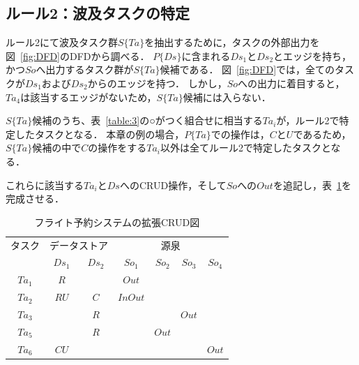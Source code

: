 \documentclass[a4paper,11pt]{jreport}
\begin{document}
\subsection{ルール2：波及タスクの特定}
ルール2にて波及タスク群$S\{Ta\}$を抽出するために，タスクの外部出力を図~\ref{fig:DFD}のDFDから調べる．
$P\{Ds\}$に含まれる$Ds_1$と$Ds_2$とエッジを持ち，かつ$So$へ出力するタスク群が$S\{Ta\}$候補である．
図~\ref{fig:DFD}では，全てのタスクが$Ds_1$および$Ds_2$からのエッジを持つ．
しかし，$So$への出力に着目すると，$Ta_4$は該当するエッジがないため，$S\{Ta\}$候補には入らない．

$S\{Ta\}$候補のうち、表~\ref{table:3}の○がつく組合せに相当する$Ta_i$が，ルール2で特定したタスクとなる．
本章の例の場合，$P\{Ta\}$での操作は，$C$と$U$であるため，$S\{Ta\}$候補の中で$C$の操作をする$Ta_i$以外は全てルール2で特定したタスクとなる．

これらに該当する$Ta_i$と$Ds$へのCRUD操作，そして$So$への$Out$を追記し，表~\ref{ECRUD2}を完成させる．

\begin{table}[t]
\caption{フライト予約システムの拡張CRUD図}
\label{ECRUD2}
\begin{center}
\begin{tabular}{c||c|c||c|c|c|c}
\hline
タスク&\multicolumn{2}{c||}{データストア}&\multicolumn{4}{c}{源泉}\\
&$Ds_1$&$Ds_2$&$So_1$&$So_2$&$So_3$&$So_4$\\
\hline\hline
$Ta_1$&$R$&&$Out$&&&\\
\hline
$Ta_2$&$RU$&$C$&$InOut$&&&\\
\hline
$Ta_3$&&$R$&&&$Out$&\\
\hline
$Ta_5$&&$R$&&$Out$&&\\
\hline
$Ta_6$&$CU$&&&&&$Out$\\
\hline
\end{tabular}
\end{center}　
\end{table}%
\end{document}
